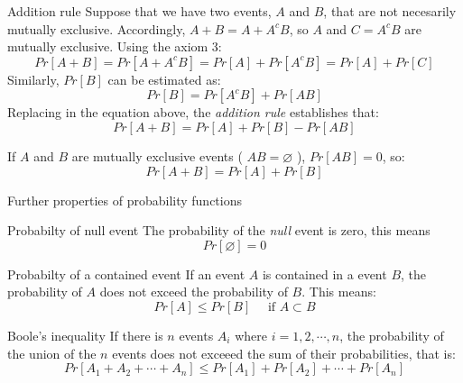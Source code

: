 \documentclass[8pt]{beamer}
\begin{document}
\begin{frame}{Addition rule}
    Suppose that we have two events, $A$ and $B$, that are not necesarily mutually exclusive. Accordingly, $A + B = A + A^c B$, so $A$ and $C = A^c B$ are mutually exclusive. Using the axiom 3:
    $$
    Pr[A + B] = Pr[A + A^c B] = Pr[A] + Pr[A^c B] = Pr[A] + Pr[C]
    $$
    Similarly, $Pr[B]$ can be estimated as:
    $$
    Pr[B] = Pr[A^c B] + Pr[AB]
    $$
    Replacing in the equation above, the \emph{addition rule} establishes that:
    $$
    Pr[A + B] =  Pr[A] + Pr[B] - Pr[AB]
    $$

    If $A$ and $B$ are mutually exclusive events ( $AB = \varnothing$ ), $Pr[AB] = 0$, so:
    $$
    Pr[A + B]  = Pr[A] + Pr[B]
    $$
\end{frame}

\begin{frame}{Further properties of probability functions}

    \begin{block}{Probabilty of null event}
        The probability of the \emph{null} event is zero, this means
        $$
        Pr[\varnothing] = 0
        $$
    \end{block}
    \begin{block}{Probabilty of a contained event}
        If an event $A$ is contained in a event $B$, the probability of $A$ does not exceed the probability of $B$. This means:
        $$
        Pr[A] \leq Pr[B] \quad \text{ if } A \subset B
        $$
    \end{block}
    \begin{block}{Boole's inequality}
        If there is $n$ events $A_i$ where $i = 1, 2, \cdots, n$, the probability of the union of the $n$ events does not exceeed the sum of their probabilities, that is:
        $$
        Pr[A_1 + A_2 + \cdots + A_n] \leq Pr[A_1] + Pr[A_2] + \cdots + Pr[A_n]
        $$
    \end{block}
\end{frame}
\end{document}
